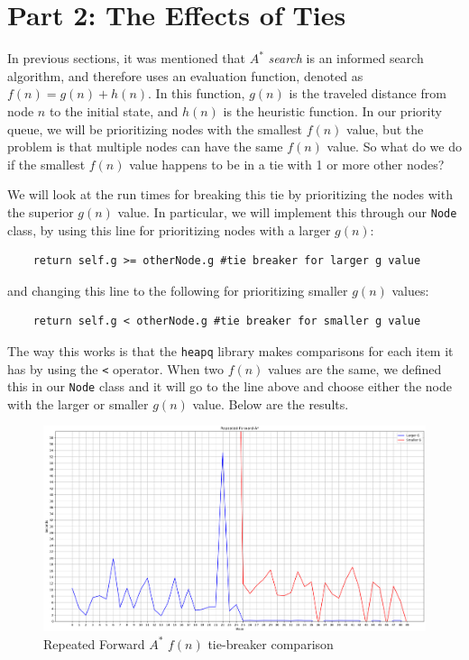 
\section{Part 2: The Effects of Ties}                               
\label{sec: Part 2}

In previous sections, it was mentioned that $A^*$ \emph{search} is an informed search algorithm, and therefore uses an evaluation function, denoted as $f(n) = g(n) + h(n)$. In this function, $g(n)$ is the traveled distance from node $n$ to the initial state, and $h(n)$ is the heuristic function. In our priority queue, we will be prioritizing nodes with the smallest $f(n)$ value, but the problem is that multiple nodes can have the same $f(n)$ value. So what do we do if the smallest $f(n)$ value happens to be in a tie with 1 or more other nodes? 


We will look at the run times for breaking this tie by prioritizing the nodes with the superior $g(n)$ value. In particular, we will implement this through our \texttt{Node} class, by using this line for prioritizing nodes with a larger $g(n)$:
\begin{lstlisting}
    return self.g >= otherNode.g #tie breaker for larger g value
\end{lstlisting}

and changing this line to the following for prioritizing smaller $g(n)$ values:

\begin{lstlisting}
    return self.g < otherNode.g #tie breaker for smaller g value
\end{lstlisting}

The way this works is that the \texttt{heapq} library makes comparisons for each item it has by using the \texttt{<} operator. When two $f(n)$ values are the same, we defined this in our \texttt{Node} class and it will go to the line above and choose either the node with the larger or smaller $g(n)$ value. Below are the results.

\begin{figure}[H]
  \centering
  \includegraphics[width=1\linewidth]{Report/Part2/Figure_1.png}  
\caption{Repeated Forward $A^*$ $f(n)$ tie-breaker comparison}
\end{figure}

